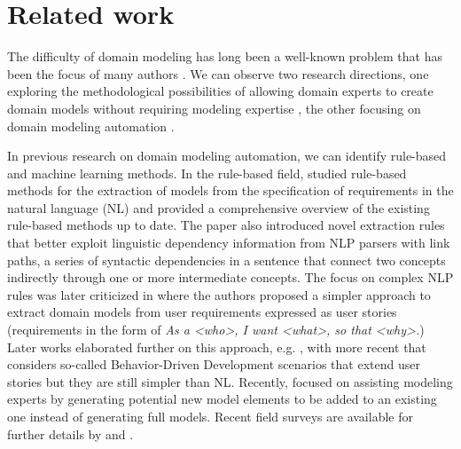 \chapter{Related work}
\label{chap:related_work}

The difficulty of domain modeling has long been a well-known problem that has been the focus of many authors \cite{Bossung2007}.
We can observe two research directions, one exploring the methodological possibilities of allowing domain experts to create domain models without requiring modeling expertise \cite{Bossung2007,Denaux2011,Ionita2015}, the other focusing on domain modeling automation \cite{Arora2016,Saeedizade2024,Lucassen2017,Burgueno2021}.

In previous research on domain modeling automation, we can identify rule-based and machine learning methods.
In the rule-based field, \citet{Arora2016} studied rule-based methods for the extraction of models from the specification of requirements in the natural language (NL) and provided a comprehensive overview of the existing rule-based methods up to date.
The paper also introduced novel extraction rules that better exploit linguistic dependency information from NLP parsers with link paths, a series of syntactic dependencies in a sentence that connect two concepts indirectly through one or more intermediate concepts.
The focus on complex NLP rules was later criticized in \cite{Lucassen2017} where the authors proposed a simpler approach to extract domain models from user requirements expressed as user stories (requirements in the form of \emph{As a <who>, I want <what>, so that <why>.})
Later works elaborated further on this approach, e.g. \citet{Nasiri2021}, with more recent \citet{Gupta2023} that considers so-called Behavior-Driven Development scenarios that extend user stories but they are still simpler than NL.
Recently, \citet{Burgueno2021} focused on assisting modeling experts by generating potential new model elements to be added to an existing one instead of generating full models.
Recent field surveys are available for further details by \citet{Raharjana2021} and \citet{Sonbol2022}.

